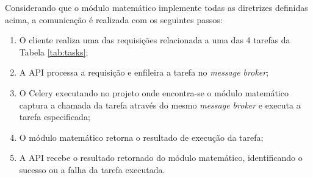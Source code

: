 	
	Considerando que o módulo matemático implemente todas as diretrizes definidas acima, a comunicação é realizada com 
	os seguintes passos:
	  
	\begin{enumerate}
	\item O cliente realiza uma das requisições relacionada a uma das 4 tarefas da Tabela \ref{tab:tasks};
	\item A API processa a requisição e enfileira a tarefa no \textit{message broker};
	\item O Celery executando no projeto onde encontra-se o módulo matemático captura a chamada da tarefa através do mesmo \textit{message broker} e 
	executa a tarefa especificada;
	\item O módulo matemático retorna o resultado de execução da tarefa;
	\item A API recebe o resultado retornado do módulo matemático, identificando o sucesso ou a falha da tarefa executada.
	\end{enumerate}

